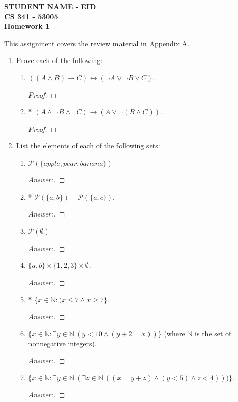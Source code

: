 \documentclass[10pt]{article}
\newcommand{\nat}{\mathbb{N}}
\begin{document}
\begin{flushleft}
\textbf{STUDENT NAME - EID \\
CS 341 - 53005 \\
Homework 1}
\end{flushleft}
This assignment covers the review material in Appendix A.
\begin{enumerate}


\item
Prove each of the following:
\begin{enumerate}
\item
$((A \land B) \rightarrow C) \leftrightarrow (\lnot A \lor \lnot B \lor C)$. \\
\begin{proof}
\end{proof}
\item
* $(A \land \lnot B \land \lnot C) \rightarrow (A \lor \lnot (B \land C))$.
\begin{proof}
\end{proof}
\end{enumerate}



\item
List the elements of each of the following sets:
\begin{enumerate}
\item
$\mathcal{P} (\{apple, pear, banana\})$
\begin{proof}[Answer:]
\end{proof}
\item
* $\mathcal{P} (\{a, b\}) - \mathcal{P} (\{a, c\})$.
\begin{proof}[Answer:]
\end{proof}
\item
$\mathcal{P} (\emptyset)$
\begin{proof}[Answer:]
\end{proof}
\item
$\{a, b\} \times \{1, 2, 3\} \times \emptyset$.
\begin{proof}[Answer:]
\end{proof}
\item
* $\{x \in \nat: (x \leq 7 \land x \geq 7\}$.
\begin{proof}[Answer:]
\end{proof}
\item
$\{x \in \nat: \exists y \in \nat \> (y < 10 \land (y + 2 = x))\}$ (where $\nat$ is the set of nonnegative integers).
\begin{proof}[Answer:]
\end{proof}
\item
$\{x \in \nat: \exists y \in \nat \> (\exists z \in \nat \> ((x = y + z) \land (y < 5) \land z < 4)))\}$.
\begin{proof}[Answer:]
\end{proof}
\end{enumerate}



\end{enumerate}
\end{document}
